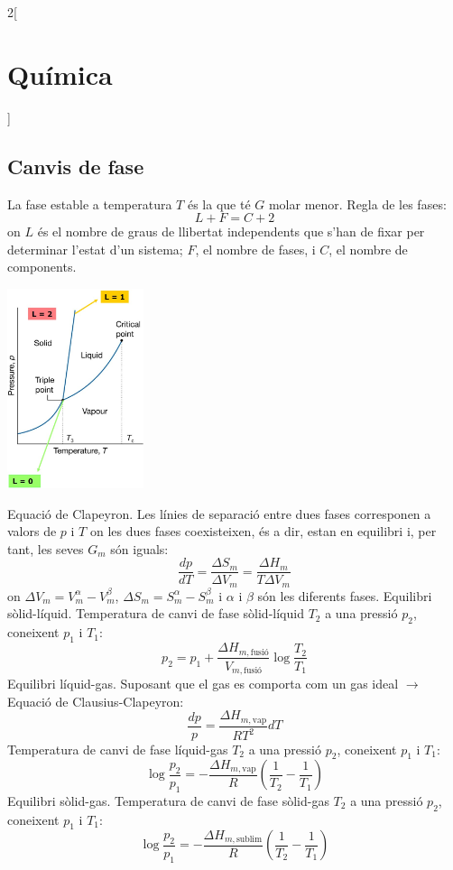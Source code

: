 \documentclass[class=article,10pt,crop=false]{standalone}
\begin{document}
\begin{multicols}{2}[\section{Química}]
\subsection{Canvis de fase}
La fase estable a temperatura $T$ és la que té $G$ molar menor.\newline
Regla de les fases: $$L+F=C+2$$
{\footnotesize on $L$ és el nombre de graus de llibertat independents que s’han de fixar per determinar l’estat d’un sistema; $F$, el nombre de fases, i $C$, el nombre de components.}\newline
\begin{minipage}{\linewidth} 
    \centering
    \includegraphics[width=4cm]{Physics/1st/Chemistry/Images/fases.jpg} 
\end{minipage}
Equació de Clapeyron. Les línies de separació entre dues fases corresponen a valors de $p$ i $T$ on les dues fases coexisteixen, és a dir, estan en equilibri i, per tant, les seves $G_m$ són iguals: $$\frac{dp}{dT}=\frac{\Delta S_m}{\Delta V_m}=\frac{\Delta H_m}{T\Delta V_m}$$ {\footnotesize on $\Delta V_m=V_m^\alpha-V_m^\beta$,  $\Delta S_m=S_m^\alpha-S_m^\beta$ i $\alpha$ i $\beta$ són les diferents fases.}\newline
Equilibri sòlid-líquid. Temperatura de canvi de fase sòlid-líquid $T_2$ a una pressió $p_2$, coneixent $p_1$ i $T_1$:
$$p_2=p_1+\frac{\Delta H_{m,\text{fusió}}}{V_{m,\text{fusió}}}\log\frac{T_2}{T_1}$$
Equilibri líquid-gas. Suposant que el gas es comporta com un gas ideal $\rightarrow$ Equació de Clausius-Clapeyron: $$\frac{dp}{p}=\frac{\Delta H_{m,\text{vap}}}{RT^2}dT$$
Temperatura de canvi de fase líquid-gas $T_2$ a una pressió $p_2$, coneixent $p_1$ i $T_1$: $$\log\frac{p_2}{p_1}=-\frac{\Delta H_{m,\text{vap}}}{R}\left(\frac{1}{T_2}-\frac{1}{T_1}\right)$$
Equilibri sòlid-gas. Temperatura de canvi de fase sòlid-gas $T_2$ a una pressió $p_2$, coneixent $p_1$ i $T_1$: $$\log\frac{p_2}{p_1}=-\frac{\Delta H_{m,\text{sublim}}}{R}\left(\frac{1}{T_2}-\frac{1}{T_1}\right)$$

\end{multicols}
\end{document}
